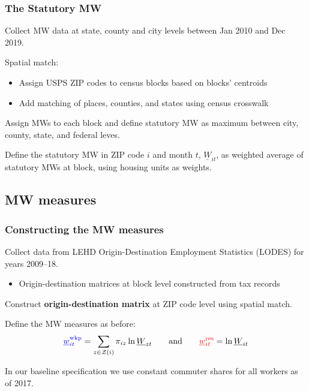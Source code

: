 \documentclass[aspectratio=169, t]{beamer}
\newcommand{\Z}{\mathcal{Z}}
\newcommand{\MW}{\underline{W}}
\newcommand{\mw}{\underline{w}}
\newcommand{\wkp}{\text{wkp}}
\newcommand{\res}{\text{res}}
\begin{document}
\begin{frame}[label=stat_MW]
    \frametitle{The Statutory MW}
    
    Collect MW data at state, county and city levels between Jan 2010 and Dec 2019.
    
    \vspace{2.5mm}
    Spatial match:
    \begin{itemize}
        \item Assign USPS ZIP codes to census blocks based on blocks' centroids
        \item Add matching of places, counties, and states using census crosswalk
    \end{itemize}
    
    \vspace{2.5mm}
    Assign MWs to each block and define statutory MW as maximum between city, 
    county, state, and federal leves.
    
    \vspace{2.5mm}
    Define the statutory MW in ZIP code $i$ and month $t$, $\MW_{it}$, as weighted
    average of statutory MWs at block, using housing units as weights.

    \vspace{2mm}
    \hyperlink{dist_mw_changes}{}
    \hyperlink{mw_changes_map}{}
\end{frame}

\subsection{MW measures}

\begin{frame}
    \frametitle{Constructing the MW measures}
        
    Collect data from LEHD Origin-Destination Employment Statistics (LODES) for years 2009--18.
    \begin{itemize}
        \item Origin-destination matrices at block level constructed from tax records
    \end{itemize}

    \vspace{1mm}
    Construct \textbf{origin-destination matrix} at ZIP code level using spatial match.
    
    \pause
    \vspace{2mm}
    Define the MW measures as before:
    $$
    {\color{blue} \mw^{\wkp}_{it}} = \sum_{z \in \Z(i)} \pi_{i z} \ln \MW_{zt}
    \quad\quad\text{and}\quad\quad
    {\color{red} \mw^{\res}_{it}} = \ln \MW_{it}
    $$

    \vspace{2mm}
    In our baseline specification we use constant commuter shares for all workers as of 2017.

\end{frame}
\end{document}
